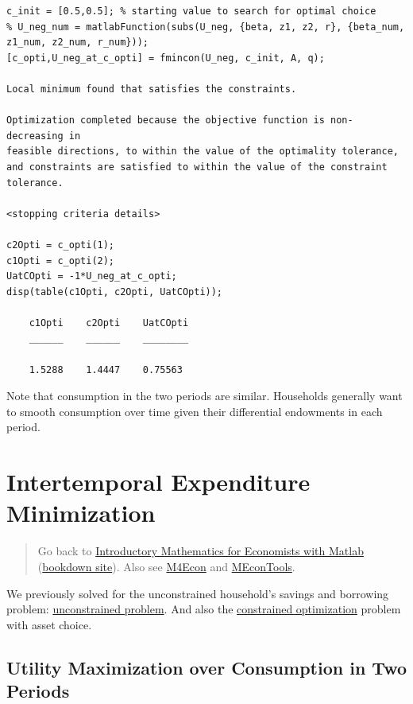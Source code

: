 \documentclass[
]{book}
\begin{document}
\begin{verbatim}
c_init = [0.5,0.5]; % starting value to search for optimal choice
% U_neg_num = matlabFunction(subs(U_neg, {beta, z1, z2, r}, {beta_num, z1_num, z2_num, r_num}));
[c_opti,U_neg_at_c_opti] = fmincon(U_neg, c_init, A, q);

Local minimum found that satisfies the constraints.

Optimization completed because the objective function is non-decreasing in 
feasible directions, to within the value of the optimality tolerance,
and constraints are satisfied to within the value of the constraint tolerance.

<stopping criteria details>

c2Opti = c_opti(1);
c1Opti = c_opti(2);
UatCOpti = -1*U_neg_at_c_opti;
disp(table(c1Opti, c2Opti, UatCOpti));

    c1Opti    c2Opti    UatCOpti
    ______    ______    ________

    1.5288    1.4447    0.75563 
\end{verbatim}

Note that consumption in the two periods are similar. Households
generally want to smooth consumption over time given their differential
endowments in each period.

\hypertarget{intertemporal-expenditure-minimization}{%
\section{Intertemporal Expenditure Minimization}\label{intertemporal-expenditure-minimization}}

\begin{quote}
Go back to \href{https://math4econ.github.io/}{Introductory Mathematics for Economists with Matlab} (\href{https://math4econ.github.io/bookdown}{bookdown site}). Also see \href{http://fanwangecon.github.io/M4Econ}{M4Econ} and \href{https://fanwangecon.github.io/MEconTools/}{MEconTools}.
\end{quote}

We previously solved for the unconstrained household's savings and
borrowing problem: \href{https://math4econ.github.io/derivative_application/K_save_households.html}{unconstrained
problem}.
And also the \href{https://math4econ.github.io/opti_hh_constrained_brsv_inequality/household_borrow_constrained.html}{constrained
optimization}
problem with asset choice.

\hypertarget{utility-maximization-over-consumption-in-two-periods-1}{%
\subsection{Utility Maximization over Consumption in Two Periods}\label{utility-maximization-over-consumption-in-two-periods-1}}
\end{document}
